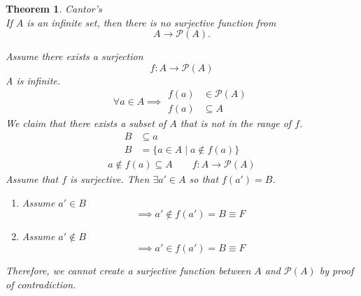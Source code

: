\documentclass[letterpaper, 12pt]{article}
\newtheorem{theorem}{Theorem}[section]
\newenvironment{proof}[1][Proof]{\begin{trivlist}
\item[\hskip \labelsep {\bfseries #1}]}{\end{trivlist}}
\begin{document}
    \begin{theorem}
        Cantor's \\
        If $A$ is an infinite set, then there is no surjective function from 
        \[A \rightarrow \mathcal{P}(A).\]
        \begin{proof}
            Assume there exists a surjection
            \[f: A \to \mathcal{P}(A)\]
            A is infinite.
            \[\forall a \in A \implies \begin{aligned}
                f(a) &\in \mathcal{P}(A) \\
                f(a) &\subseteq A
            \end{aligned}\]
            We claim that there exists a subset of $A$ that is not in the range of $f$.
            \begin{align*}
                B &\subseteq a \\
                B &= \{a \in A \mid a \notin f(a)\}
            \end{align*}
            \begin{gather*}
                a \notin f(a) \subseteq A \qquad f: A \to \mathcal{P}(A)
            \end{gather*}
            Assume that $f$ is surjective. Then $\exists a' \in A$ so that $f(a') = B$.
            \begin{enumerate}
                \item Assume $a' \in B$
                \[\implies a' \notin f(a') = B \equiv F\]
                \item Assume $a' \notin B$
                \[\implies a' \in f(a') = B \equiv F\]
            \end{enumerate}
            Therefore, we cannot create a surjective function between $A$ and $\mathcal{P}(A)$ 
            by proof of contradiction.
        \end{proof}
    \end{theorem}
\end{document}
